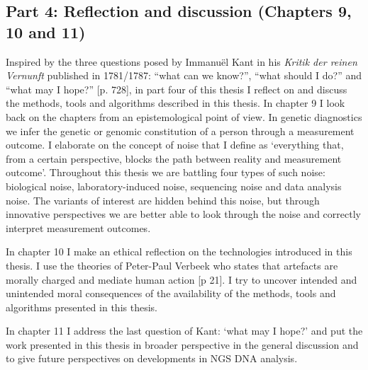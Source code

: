 \subsection{Part 4: Reflection and discussion (Chapters 9, 10 and 11)}\label{Part4}
Inspired by the three questions posed by Immanuël Kant in his \textsl{Kritik der reinen Vernunft} published in 1781/1787: “what can we know?”, “what should I do?” and “what may I hope?” \cite{Kant_1781a}[p. 728], in part four of this thesis I reflect on and discuss the methods, tools and algorithms described in this thesis. 
In chapter 9 I look back on the chapters from an epistemological point of view. 
In genetic diagnostics we infer the genetic or genomic constitution of a person through a measurement outcome. 
I elaborate on the concept of noise that I define as ‘everything that, from a certain perspective, blocks the path between reality and measurement outcome’. 
Throughout this thesis we are battling four types of such noise: biological noise, laboratory-induced noise, sequencing noise and data analysis noise. 
The variants of interest are hidden behind this noise, but through innovative perspectives we are better able to look through the noise and correctly interpret measurement outcomes. 

In chapter 10 I make an ethical reflection on the technologies introduced in this thesis. I use the theories of Peter-Paul Verbeek who states that artefacts are morally charged and mediate human action \cite{Verbeek_2011}[p 21]. 
I try to uncover intended and unintended moral consequences of the availability of the methods, tools and algorithms presented in this thesis. 

In chapter 11 I address the last question of Kant: ‘what may I hope?’ and put the work presented in this thesis in broader perspective in the general discussion and to give future perspectives on developments in NGS DNA analysis.

